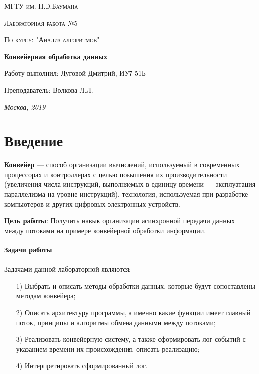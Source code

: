 \documentclass[a4paper,12pt]{report}
\begin{document}
\begin{titlepage}
	\centering
	{\scshape\LARGE МГТУ им. Н.Э.Баумана \par}
	\vspace{4cm}
	{\scshape\Large Лабораторная работа №5\par}
	\vspace{0.5cm}	
	{\scshape\Large По курсу: "Анализ алгоритмов"\par}
	\vspace{2cm}
	{\huge\bfseries Конвейерная обработка данных \par}
	\vspace{3cm}
	\Large Работу выполнил: Луговой Дмитрий, ИУ7-51Б\par
	\vspace{0.5cm}
	\Large Преподаватель:  Волкова Л.Л.\par

	\vfill
	\large \textit {Москва, 2019} \par
\end{titlepage}

\setcounter{page}{2}

\tableofcontents

\newpage
\chapter*{Введение}
\hspace{0.6cm}  \textbf{Конвейер} — способ организации вычислений, используемый в современных процессорах и контроллерах с целью повышения их производительности (увеличения числа инструкций, выполняемых в единицу времени — эксплуатация параллелизма на уровне инструкций), технология, используемая при разработке компьютеров и других цифровых электронных устройств.

\textbf{Цель работы}: Получить навык организации асинхронной передачи данных между потоками на примере конвейерной обработки информации.\\\\

\textbf{\LARGE Задачи работы}\\\\
Задачами данной лабораторной являются:
\begin{enumerate}
\item[1)] Выбрать и описать методы обработки данных, которые будут сопоставлены методам конвейера;
\item[2)] Описать архитектуру программы, а именно какие функции имеет главный поток, принципы и алгоритмы обмена данными между потоками;
\item[3)] Реализовать конвейерную систему, а также сформировать лог событий с указанием времени их происхождения, описать реализацию;
\item[4)] Интерпретировать сформированный лог.
\end{enumerate}
\end{document}
